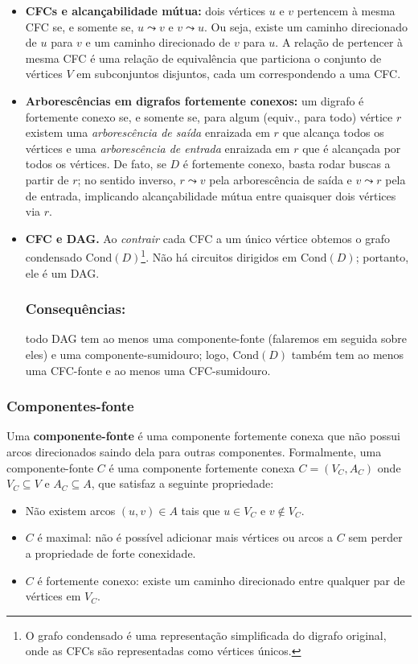 \begin{itemize}
	\item \textbf{CFCs e alcançabilidade mútua:} dois vértices \(u\) e \(v\) pertencem à mesma CFC se, e somente se, \(u\leadsto v\) e \(v\leadsto u\). Ou seja, existe um caminho direcionado de \(u\) para \(v\) e um caminho direcionado de \(v\) para \(u\). A relação de pertencer à mesma CFC é uma relação de equivalência que particiona o conjunto de vértices \(V\) em subconjuntos disjuntos, cada um correspondendo a uma CFC.
	\item \textbf{Arborescências em digrafos fortemente conexos:} um digrafo é fortemente conexo se, e somente se, para algum (equiv., para todo) vértice $r$ existem uma \emph{arborescência de saída} enraizada em $r$ que alcança todos os vértices e uma \emph{arborescência de entrada} enraizada em $r$ que é alcançada por todos os vértices. De fato, se $D$ é fortemente conexo, basta rodar buscas a partir de $r$; no sentido inverso, $r\leadsto v$ pela arborescência de saída e $v\leadsto r$ pela de entrada, implicando alcançabilidade mútua entre quaisquer dois vértices via $r$.
	\item \textbf{CFC e DAG.} Ao \emph{contrair} cada CFC a um único vértice obtemos o grafo condensado $\mathrm{Cond}(D)$\footnote{O grafo condensado é uma representação simplificada do digrafo original, onde as CFCs são representadas como vértices únicos.}. Não há circuitos dirigidos em $\mathrm{Cond}(D)$; portanto, ele é um DAG.

	      \subsubsection{Consequências:}
	      todo DAG tem ao menos uma componente-fonte (falaremos em seguida sobre eles) e uma componente-sumidouro; logo, $\mathrm{Cond}(D)$ também tem ao menos uma CFC-fonte e ao menos uma CFC-sumidouro.
\end{itemize}

\subsubsection{Componentes-fonte}
Uma \textbf{componente-fonte} é uma componente fortemente conexa que não possui arcos direcionados saindo dela para outras componentes. Formalmente, uma componente-fonte \(C\) é uma componente fortemente conexa \(C = (V_C, A_C)\) onde \(V_C \subseteq V\) e \(A_C \subseteq A\), que satisfaz a seguinte propriedade:
\begin{itemize}
	\item Não existem arcos \((u, v) \in A\) tais que \(u \in V_C\) e \(v \notin V_C\).
	\item \(C\) é maximal: não é possível adicionar mais vértices ou arcos a \(C\) sem perder a propriedade de forte conexidade.
	\item \(C\) é fortemente conexo: existe um caminho direcionado entre qualquer par de vértices em \(V_C\).
\end{itemize}


